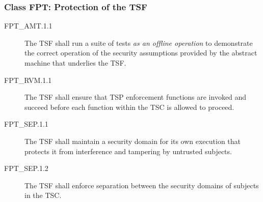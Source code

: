 \documentclass[12pt,english]{scrbook}
\begin{document}



\subsubsection{Class FPT: Protection of the TSF}





\begin{description}

\item[FPT{\_}AMT.1.1 ]


The TSF shall run a suite of tests \emph{as an offline
operation} to demonstrate the correct operation of the security
assumptions provided by the abstract machine that underlies the
TSF.



\end{description}


\begin{description}

\item[FPT{\_}RVM.1.1 ]


The TSF shall ensure that TSP enforcement functions are invoked
and succeed before each function within the TSC is allowed to
proceed.



\end{description}


\begin{description}

\item[FPT{\_}SEP.1.1 ]

The TSF shall maintain a security domain for its own execution that protects it
from interference and tampering by untrusted subjects.

\item[FPT{\_}SEP.1.2 ]

The TSF shall enforce separation between the security domains of subjects in
the TSC.

\end{description}


\end{document}
